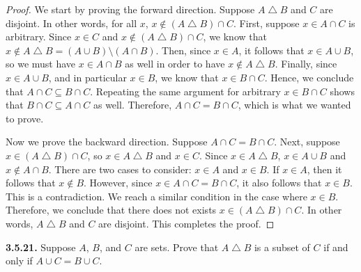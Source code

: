 \documentclass[12pt]{amsart}
\newenvironment{statement}[1]{\smallskip\noindent\color[rgb]{.6627, .3529, .6314} {\bf #1.}}{}
\theoremstyle{definition}
\theoremstyle{remark}
\begin{document}
\begin{proof}
We start by proving the forward direction.
Suppose $A \bigtriangleup B$ and $C$ are disjoint.
In other words, for all $x$, $x \notin (A \bigtriangleup B) \cap C$.
First, suppose $x \in A \cap C$ is arbitrary.
Since $x \in C$ and $x \notin (A \bigtriangleup B) \cap C$, we know that $x \notin A \bigtriangleup B = (A \cup B) \setminus (A \cap B)$.
Then, since $x \in A$, it follows that $x \in A \cup B$, so we must have $x \in A \cap B$ as well in order to have $x \notin A \bigtriangleup B$.
Finally, since $x \in A \cup B$, and in particular $x \in B$, we know that $x \in B \cap C$.
Hence, we conclude that $A \cap C \subseteq B \cap C$.
Repeating the same argument for arbitrary $x \in B \cap C$ shows that $B \cap C \subseteq A \cap C$ as well.
Therefore, $A \cap C = B \cap C$, which is what we wanted to prove.

Now we prove the backward direction.
Suppose $A \cap C = B \cap C$.
Next, suppose $x \in (A \bigtriangleup B) \cap C$, so $x \in A \bigtriangleup B$ and $x \in C$.
Since $x \in A \bigtriangleup B$, $x \in A \cup B$ and $x \notin A \cap B$.
There are two cases to consider: $x \in A$ and $x \in B$.
If $x \in A$, then it follows that $x \notin B$.
However, since $x \in A \cap C = B \cap C$, it also follows that $x \in B$.
This is a contradiction.
We reach a similar condition in the case where $x \in B$.
Therefore, we conclude that there does not exists $x \in (A \bigtriangleup B) \cap C$.
In other words, $A \bigtriangleup B$ and $C$ are disjoint.
This completes the proof.
\end{proof}


\begin{statement}{3.5.21}
Suppose $A$, $B$, and $C$ are sets.
Prove that $A \bigtriangleup B$ is a subset of $C$ if and only if $A \cup C = B \cup C$.
\end{statement}
\end{document}
